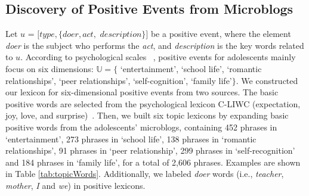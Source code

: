 \documentclass[5p,times,numbers,authoryear]{elsarticle}
\begin{document}
\subsection{Discovery of Positive Events from Microblogs}
\label{sec:frame1}
Let $u$ = $[type,\{doer, act,$ $description\}]$ be a positive event,
where the element \emph{doer} is the subject who performs the \emph{act},
and \emph{description} is the key words related to $u$.
According to psychological scales ~\citep{Jun2008Influence,hassles},
positive events for adolescents mainly focus on six dimensions:  $\mathbb{U} =\{$ `entertainment', `school life', `romantic relationships', `peer relationships', `self-cognition', `family life'$\}$. We constructed our lexicon for six-dimensional positive events from two sources.
The basic positive words are selected from the psychological lexicon C-LIWC (expectation, joy, love, and surprise)~\citep{Tausczik2010The}.
Then, we built six topic lexicons by expanding basic positive words from the adolescents' microblogs, containing 452 phrases in `entertainment',
273 phrases in `school life',
138 phrases in `romantic relationships',
91 phrases in `peer relationship',
299 phrases in `self-recognition' and 184 phrases in `family life', for a total of 2,606 phrases. 
Examples are shown in Table \ref{tab:topicWords}.
Additionally, we labeled \emph{doer} words (i.e., \emph{teacher}, \emph{mother}, \emph{I} and \emph{we}) in positive lexicons.
\end{document}
